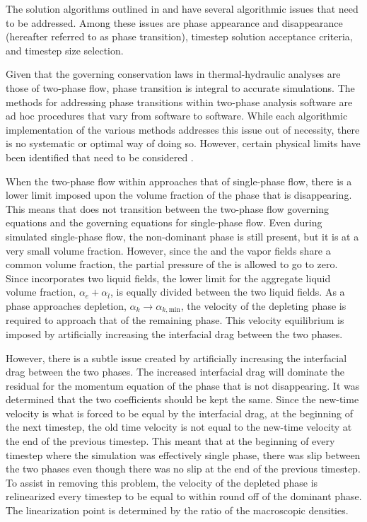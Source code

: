 
The solution algorithms outlined in  and  have several algorithmic issues that need to be addressed.
Among these issues are phase appearance and disappearance (hereafter referred to as phase transition), timestep solution acceptance criteria, and timestep size selection.

Given that the governing conservation laws in thermal-hydraulic analyses are those of two-phase flow, phase transition is integral to accurate simulations.
The methods for addressing phase transitions within two-phase analysis software are ad hoc procedures that vary from software to software.
While each algorithmic implementation of the various methods addresses this issue out of necessity, there is no systematic or optimal way of doing so.
However, certain physical limits have been identified that need to be considered \cite{Bestion2000}.

When the two-phase flow within \cobra{} approaches that of single-phase flow, there is a lower limit imposed upon the volume fraction of the phase that is disappearing.
This means that \cobra{} does not transition between the two-phase flow governing equations and the governing equations for single-phase flow.
Even during simulated single-phase flow, the non-dominant phase is still present, but it is at a very small volume fraction.
However, since the \ncgs{} and the vapor fields share a common volume fraction, the partial pressure of the \ncgs{} is allowed to go to zero. 
Since \cobra{} incorporates two liquid fields, the lower limit for the aggregate liquid volume fraction, $\alpha_e + \alpha_l$, is equally divided between the two liquid fields.
As a phase approaches depletion, $\alpha_k \rightarrow \alpha_{k,\text{min}}$, the velocity of the depleting phase is required to approach that of the remaining phase.
This velocity equilibrium is imposed by artificially increasing the interfacial drag between the two phases.

However, there is a subtle issue created by artificially increasing the interfacial drag between the two phases.
The increased interfacial drag will dominate the residual for the momentum equation of the phase that is not disappearing.
It was determined that the two coefficients should be kept the same.
Since the new-time velocity is what is forced to be equal by the interfacial drag, at the beginning of the next timestep, the old time velocity is not equal to the new-time velocity at the end of the previous timestep.
This meant that at the beginning of every timestep where the simulation was effectively single phase, there was slip between the two phases even though there was no slip at the end of the previous timestep.
To assist in removing this problem, the velocity of the depleted phase is relinearized every timestep to be equal to within round off of the dominant phase.
The linearization point is determined by the ratio of the macroscopic densities.
 
